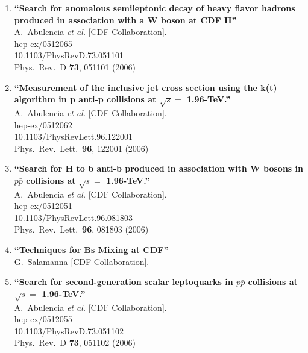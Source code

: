 \documentclass{article}
\begin{document}
\begin{enumerate}
\item%
{\bf ``Search for anomalous semileptonic decay of heavy flavor hadrons produced in association with a W boson at CDF II''}
  \\{}A.~Abulencia {\it et al.}  [CDF Collaboration].
  \\{}hep-ex/0512065
    \\{}10.1103/PhysRevD.73.051101
\\{}Phys.\ Rev.\ D {\bf 73}, 051101 (2006) %


\item%
{\bf ``Measurement of the inclusive jet cross section using the k(t) algorithm in p anti-p collisions at $\sqrt{s}=$ 1.96-TeV.''}
  \\{}A.~Abulencia {\it et al.}  [CDF Collaboration].
  \\{}hep-ex/0512062
    \\{}10.1103/PhysRevLett.96.122001
\\{}Phys.\ Rev.\ Lett.\  {\bf 96}, 122001 (2006) %


\item%
{\bf ``Search for H to b anti-b produced in association with W bosons in $p\bar{p}$ collisions at $\sqrt{s} =$ 1.96-TeV.''}
  \\{}A.~Abulencia {\it et al.}  [CDF Collaboration].
  \\{}hep-ex/0512051
    \\{}10.1103/PhysRevLett.96.081803
\\{}Phys.\ Rev.\ Lett.\  {\bf 96}, 081803 (2006) %


\item%
{\bf ``Techniques for Bs Mixing at CDF''}
  \\{}G.~Salamanna [CDF Collaboration].
  



\item%
{\bf ``Search for second-generation scalar leptoquarks in $p\bar{p}$ collisions at $\sqrt{s} =$ 1.96-TeV.''}
  \\{}A.~Abulencia {\it et al.}  [CDF Collaboration].
  \\{}hep-ex/0512055
    \\{}10.1103/PhysRevD.73.051102
\\{}Phys.\ Rev.\ D {\bf 73}, 051102 (2006) %



\end{enumerate}
\end{document}

